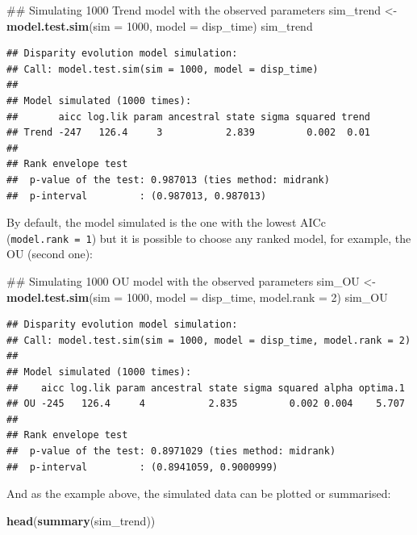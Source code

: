 \documentclass[]{book}
\newenvironment{Shaded}{\begin{snugshade}}{\end{snugshade}}
\newcommand{\KeywordTok}[1]{\textcolor[rgb]{0.13,0.29,0.53}{\textbf{#1}}}
\newcommand{\DataTypeTok}[1]{\textcolor[rgb]{0.13,0.29,0.53}{#1}}
\newcommand{\DecValTok}[1]{\textcolor[rgb]{0.00,0.00,0.81}{#1}}
\newcommand{\StringTok}[1]{\textcolor[rgb]{0.31,0.60,0.02}{#1}}
\newcommand{\NormalTok}[1]{#1}
\theoremstyle{definition}
\theoremstyle{definition}
\theoremstyle{definition}
\theoremstyle{remark}
\begin{document}
\begin{Shaded}
\begin{Highlighting}[]
\NormalTok{## Simulating 1000 Trend model with the observed parameters}
\NormalTok{sim_trend <-}\StringTok{ }\KeywordTok{model.test.sim}\NormalTok{(}\DataTypeTok{sim =} \DecValTok{1000}\NormalTok{, }\DataTypeTok{model =}\NormalTok{ disp_time)}
\NormalTok{sim_trend}
\end{Highlighting}
\end{Shaded}

\begin{verbatim}
## Disparity evolution model simulation:
## Call: model.test.sim(sim = 1000, model = disp_time) 
## 
## Model simulated (1000 times):
##       aicc log.lik param ancestral state sigma squared trend
## Trend -247   126.4     3           2.839         0.002  0.01
## 
## Rank envelope test
##  p-value of the test: 0.987013 (ties method: midrank)
##  p-interval         : (0.987013, 0.987013)
\end{verbatim}

By default, the model simulated is the one with the lowest AICc
(\texttt{model.rank\ =\ 1}) but it is possible to choose any ranked
model, for example, the OU (second one):

\begin{Shaded}
\begin{Highlighting}[]
\NormalTok{## Simulating 1000 OU model with the observed parameters}
\NormalTok{sim_OU <-}\StringTok{ }\KeywordTok{model.test.sim}\NormalTok{(}\DataTypeTok{sim =} \DecValTok{1000}\NormalTok{, }\DataTypeTok{model =}\NormalTok{ disp_time, }\DataTypeTok{model.rank =} \DecValTok{2}\NormalTok{)}
\NormalTok{sim_OU}
\end{Highlighting}
\end{Shaded}

\begin{verbatim}
## Disparity evolution model simulation:
## Call: model.test.sim(sim = 1000, model = disp_time, model.rank = 2) 
## 
## Model simulated (1000 times):
##    aicc log.lik param ancestral state sigma squared alpha optima.1
## OU -245   126.4     4           2.835         0.002 0.004    5.707
## 
## Rank envelope test
##  p-value of the test: 0.8971029 (ties method: midrank)
##  p-interval         : (0.8941059, 0.9000999)
\end{verbatim}

And as the example above, the simulated data can be plotted or
summarised:

\begin{Shaded}
\begin{Highlighting}[]
\KeywordTok{head}\NormalTok{(}\KeywordTok{summary}\NormalTok{(sim_trend))}
\end{Highlighting}
\end{Shaded}
\end{document}
